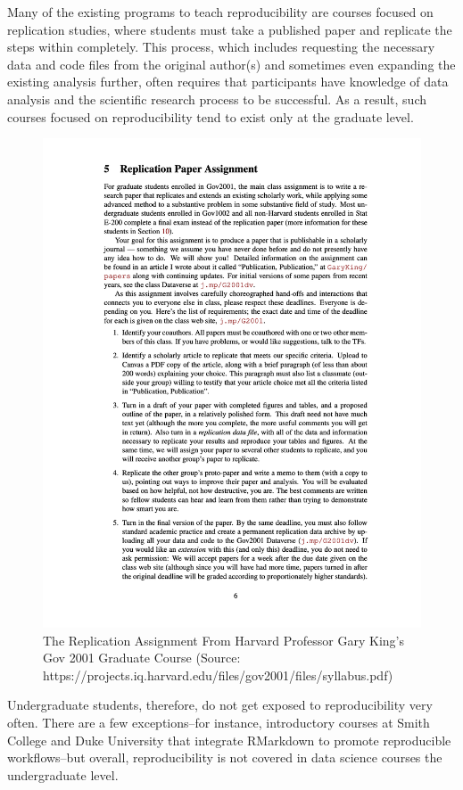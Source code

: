 \documentclass[12pt,twoside]{reedthesis}
\begin{document}
Many of the existing programs to teach reproducibility are courses
focused on replication studies, where students must take a published
paper and replicate the steps within completely. This process, which
includes requesting the necessary data and code files from the original
author(s) and sometimes even expanding the existing analysis further,
often requires that participants have knowledge of data analysis and the
scientific research process to be successful. As a result, such courses
focused on reproducibility tend to exist only at the graduate level.
\begin{figure}
\includegraphics[width=1\linewidth]{figure/gov-2001-replication} \caption{The Replication Assignment From Harvard Professor Gary King's Gov 2001 Graduate Course (Source: https://projects.iq.harvard.edu/files/gov2001/files/syllabus.pdf)}\label{fig:unnamed-chunk-45}
\end{figure}
Undergraduate students, therefore, do not get exposed to reproducibility
very often. There are a few exceptions--for instance, introductory
courses at Smith College and Duke University that integrate RMarkdown to
promote reproducible workflows--but overall, reproducibility is not
covered in data science courses the undergraduate level.
\end{document}
